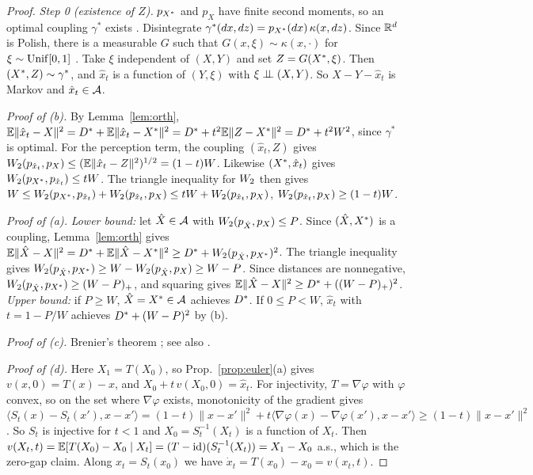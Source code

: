 \begin{proof}
\emph{Step 0 (existence of $Z$).} $p_{X^{*}}$ and $p_X$ have finite second moments, so an optimal coupling $\gamma^*$ exists \cite[Thm.~4.1]{villani2009optimal}. Disintegrate $\gamma^*(dx,dz)=p_{X^{*}}(dx)\,\kappa(x,dz)$. Since $\mathbb{R}^d$ is Polish, there is a measurable $G$ such that $G(x,\xi)\sim\kappa(x,\cdot)$ for $\xi\sim\mathrm{Unif}[0,1]$ \cite[Lemma~4.22]{kallenberg2021foundations}. Take $\xi$ independent of $(X,Y)$ and set $Z=G(X^{*},\xi)$. Then $(X^{*},Z)\sim\gamma^*$, and $\hat x_t$ is a function of $(Y,\xi)$ with $\xi\perp\!\!\!\perp(X,Y)$. So $X-Y-\hat x_t$ is Markov and $\hat x_t\in\mathcal{A}$.

\emph{Proof of (b).} By Lemma~\ref{lem:orth}, $\mathbb{E}\|\hat x_t-X\|^2=D^{*}+\mathbb{E}\|\hat x_t-X^{*}\|^2=D^{*}+t^2\mathbb{E}\|Z-X^{*}\|^2=D^{*}+t^2W^2$, since $\gamma^*$ is optimal. For the perception term, the coupling $(\hat x_t,Z)$ gives $W_2(p_{\hat x_t},p_X)\le(\mathbb{E}\|\hat x_t-Z\|^2)^{1/2}=(1-t)W$. Likewise $(X^{*},\hat x_t)$ gives $W_2(p_{X^{*}},p_{\hat x_t})\le tW$. The triangle inequality for $W_2$ then gives $W\le W_2(p_{X^{*}},p_{\hat x_t})+W_2(p_{\hat x_t},p_X)\le tW+W_2(p_{\hat x_t},p_X)$, \ie $W_2(p_{\hat x_t},p_X)\ge(1-t)W$.

\emph{Proof of (a).} \emph{Lower bound:} let $\hat X\in\mathcal{A}$ with $W_2(p_{\hat X},p_X)\le P$. Since $(\hat X,X^{*})$ is a coupling, Lemma~\ref{lem:orth} gives $\mathbb{E}\|\hat X-X\|^2=D^{*}+\mathbb{E}\|\hat X-X^{*}\|^2\ge D^{*}+W_2(p_{\hat X},p_{X^{*}})^2$. The triangle inequality gives $W_2(p_{\hat X},p_{X^{*}})\ge W-W_2(p_{\hat X},p_X)\ge W-P$. Since distances are nonnegative, $W_2(p_{\hat X},p_{X^{*}})\ge(W-P)_+$, and squaring gives $\mathbb{E}\|\hat X-X\|^2\ge D^{*}+((W-P)_+)^2$. \emph{Upper bound:} if $P\ge W$, $\hat X=X^{*}\in\mathcal{A}$ achieves $D^{*}$. If $0\le P<W$, $\hat x_t$ with $t=1-P/W$ achieves $D^{*}+(W-P)^2$ by (b).

\emph{Proof of (c).} Brenier's theorem \cite{brenier1991polar}; see also \cite[Thm.~2.12]{villani2003topics}.

\emph{Proof of (d).} Here $X_1=T(X_0)$, so Prop.~\ref{prop:euler}(a) gives $v(x,0)=T(x)-x$, and $X_0+t\,v(X_0,0)=\hat x_t$. For injectivity, $T=\nabla\varphi$ with $\varphi$ convex, so on the set where $\nabla\varphi$ exists, monotonicity of the gradient gives
$\langle S_t(x)-S_t(x'),x-x'\rangle=(1-t)\|x-x'\|^2+t\langle\nabla\varphi(x)-\nabla\varphi(x'),x-x'\rangle\ge(1-t)\|x-x'\|^2$.
So $S_t$ is injective for $t<1$ and $X_0=S_t^{-1}(X_t)$ is a function of $X_t$. Then $v(X_t,t)=\mathbb{E}[T(X_0)-X_0\mid X_t]=(T-\mathrm{id})(S_t^{-1}(X_t))=X_1-X_0$ a.s., which is the zero-gap claim. Along $x_t=S_t(x_0)$ we have $\dot x_t=T(x_0)-x_0=v(x_t,t)$.
\end{proof}

